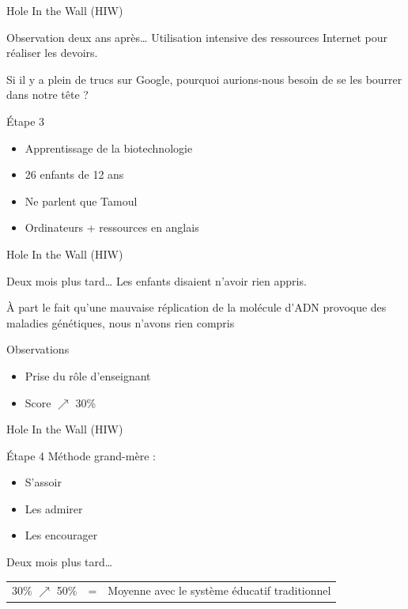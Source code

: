 \begin{frame}{Hole In the Wall (HIW)}
\begin{block}{Observation deux ans après\ldots}
  Utilisation intensive des ressources Internet pour réaliser les devoirs.
\end{block}
\pause
\begin{coolquote}
Si il y a plein de trucs sur Google, pourquoi aurions-nous besoin de se les bourrer dans notre tête ?
\end{coolquote}
\pause
  \begin{block}{Étape 3}
    \begin{itemize}
      \item Apprentissage de la biotechnologie
      \item 26 enfants de 12 ans
      \item Ne parlent que Tamoul
      \item Ordinateurs + ressources en anglais
    \end{itemize}
  \end{block}
\end{frame}

\begin{frame}{Hole In the Wall (HIW)}
  \begin{block}{Deux mois plus tard\ldots}
    Les enfants disaient n'avoir rien appris.
    \pause
    
    \begin{coolquote}
    À part le fait qu'une mauvaise réplication de la molécule d'ADN provoque des maladies génétiques, nous n'avons rien compris
    \end{coolquote}
    Observations
    \begin{itemize}
      \item Prise du rôle d'enseignant
      \item Score $\nearrow$ 30\%
    \end{itemize}
  \end{block}
\end{frame}

\begin{frame}{Hole In the Wall (HIW)}
  \begin{block}{Étape 4}
    Méthode grand-mère :
    \begin{itemize}
      \item S'assoir
      \item Les admirer
      \item Les encourager
    \end{itemize}
  \end{block}
  \pause
  \begin{block}{Deux mois plus tard\ldots}
  \begin{tabular}{l c l}
  30\% $\nearrow$ 50\% &=& Moyenne avec le système éducatif traditionnel \\
  \end{tabular}
  \end{block}
\end{frame}

